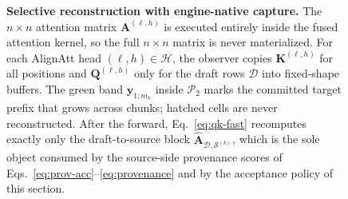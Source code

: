 \documentclass[11pt,twocolumn]{article}
\begin{document}
\begin{figure}[t]
{
}%
\caption{\textbf{Selective reconstruction with engine-native capture.} The
$n{\times}n$ attention matrix
$\mathbf{A}^{(\ell,h)}$ is executed entirely inside the fused attention
kernel, so the full $n{\times}n$ matrix is never materialized. For each
AlignAtt head $(\ell,h)\in\mathcal{H}$, the observer copies
$\mathbf{K}^{(\ell,h)}$ for all positions and $\mathbf{Q}^{(\ell,h)}$ only for
the draft rows $\mathcal{D}$ into fixed-shape buffers. The green band
$\mathbf{y}_{1:m_k}$ inside $\mathcal{P}_2$ marks the committed target prefix
that grows across chunks; hatched cells are never reconstructed. After the
forward, Eq.~\eqref{eq:qk-fast} recomputes exactly only the draft-to-source
block $\widehat{\mathbf{A}}_{\mathcal{D},\mathcal{S}^{(k)}}$, which is the sole
object consumed by the source-side provenance scores of
Eqs.~\eqref{eq:prov-acc}--\eqref{eq:provenance} and by the
acceptance policy of this section.}
\label{fig:qk-fast}
\end{figure}
\end{document}
